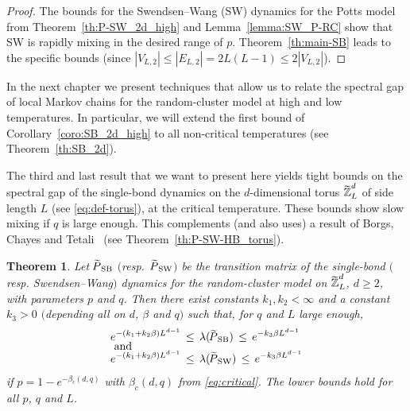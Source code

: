 \documentclass{dis}
\newtheorem{theorem}{Theorem}[chapter]
\theoremstyle{citing}
\begin{document}
\begin{proof}
The bounds for the Swendsen--Wang (SW) dynamics for the 
Potts model from Theorem~\ref{th:P-SW_2d_high} and 
Lemma~\ref{lemma:SW_P-RC} show that SW is rapidly mixing 
in the desired range of $p$. 
Theorem~\ref{th:main-SB} leads to the specific bounds 
(since 
${\left\vert {V_{L,2}} \right\vert}\le{\left\vert {E_{L,2}} \right\vert}=2L(L-1)\le2{\left\vert {V_{L,2}} \right\vert}$). 
\end{proof}
\vspace{1mm}

In the next chapter we present techniques that allow us to 
relate the spectral gap of local Markov chains for the 
random-cluster model at high and low temperatures. 
In particular, we will extend the first bound of 
Corollary~\ref{coro:SB_2d_high} to all non-critical 
temperatures (see Theorem~\ref{th:SB_2d}).

The third and last result that we want to present here 
yields tight bounds on the spectral gap of the 
single-bond dynamics on the $d$-dimensional torus ${\raisebox{2pt}{ ${\widetilde{{}}}$ }\mkern-12mu {\ensuremath{\mathbb{Z}}}}_L^d$ 
of side length $L$ (see \eqref{eq:def-torus}), 
at the critical temperature. These bounds show slow mixing 
if $q$ is large enough.
This complements (and also uses) a result of 
Borgs, Chayes and Tetali~\cite{BCT} (see 
Theorem~\ref{th:P-SW-HB_torus}).

\vspace{2mm}

\begin{theorem}\label{th:RC-SW-SB_torus}
Let ${{\raisebox{2pt}{ ${\widetilde{{}}}$ }\mkern-14mu P}_{\rm SB}}$ $($resp.~${{\raisebox{2pt}{ ${\widetilde{{}}}$ }\mkern-14mu P}_{\rm SW}}$$)$ be the transition matrix of the single-bond 
$($resp. Swendsen--Wang$)$ dynamics for the random-cluster model  
on ${\raisebox{2pt}{ ${\widetilde{{}}}$ }\mkern-12mu {\ensuremath{\mathbb{Z}}}}_L^d$, $d\ge2$, with parameters $p$ and $q$. 
Then there exist constants $k_1,k_2<\infty$ 
and a constant $k_3>0$ 
$($depending all on $d$, $\beta$ and $q$$)$
such that, for $q$ and $L$ large enough, 
\begin{align*}
e^{-(k_1 + k_2 \beta) L^{d-1}} \,&\le\, \lambda({{\raisebox{2pt}{ ${\widetilde{{}}}$ }\mkern-14mu P}_{\rm SB}}) 
	\,\le\, e^{-k_3 \beta L^{d-1}} \\[-3mm]
\intertext{\vspace*{-2mm} and}
e^{-(k_1 + k_2 \beta) L^{d-1}} \,&\le\, \lambda({{\raisebox{2pt}{ ${\widetilde{{}}}$ }\mkern-14mu P}_{\rm SW}}) 
	\,\le\, e^{-k_3 \beta L^{d-1}}
\end{align*}
if $p=1-e^{-\beta_c(d,q)}$ with $\beta_c(d,q)$ from 
\eqref{eq:critical}. 
The lower bounds hold for all $p$, $q$ and $L$. 
\end{theorem}
\vspace{1mm}
\end{document}
